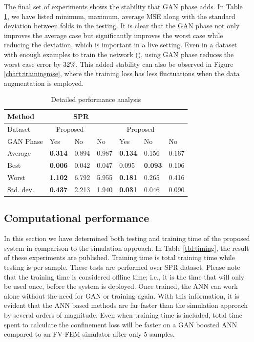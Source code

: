 \documentclass[10pt]{IEEEtran}
\begin{document}
The final set of experiments shows the stability that GAN phase adds. In Table \ref{tbl:all}, we have listed minimum, maximum, average MSE along with the standard deviation between folds in the testing. It is clear that the GAN phase not only improves the average case but significantly improves the worst case while reducing the deviation, which is important in a live setting. Even in a dataset with enough examples to train the network (\dszero), using GAN phase reduces the worst case error by 32\%. This added stability can also be observed in Figure \ref{chart:trainingmse}, where the training loss has less fluctuations when the data augmentation is employed.


\begin{table}
\caption{Detailed performance analysis}
\begin{tabular}{l|l|l|l|l|l|l}
	Method & \multicolumn{3}{c|}{SPR} & \multicolumn{3}{c}{\dszero{}} \\\hline
	Dataset & \multicolumn{2}{c|}{Proposed} & \cite{paper0}  & \multicolumn{2}{c|}{Proposed}   & \cite{paper0} \\\hline
	GAN Phase 			& Yes            & No    &  No     &   Yes            & No             & No    \\\hline
	Average   			& \textbf{0.314} & 0.894 & 0.987   &   \textbf{0.134} & 0.156          & 0.167 \\
	Best      			& \textbf{0.006} & 0.042 & 0.047   &   0.095          & \textbf{0.093} & 0.106 \\
	Worst     			& \textbf{1.102} & 6.792 & 5.955   &   \textbf{0.181} & 0.265          & 0.416 \\
	Std. dev.       	& \textbf{0.437} & 2.213 & 1.940   &   \textbf{0.031} & 0.046          & 0.090 \\
\end{tabular}
\label{tbl:all}
\end{table}


\subsection{Computational performance}

In this section we have determined both testing and training time of the proposed system in comparison to the simulation approach. In Table \ref{tbl:timing}, the result of these experiments are published. Training time is total training time while testing is per sample. These tests are performed over SPR dataset. Please note that the training time is considered offline time; i.e., it is the time that will only be used once, before the system is deployed. Once trained, the ANN can work alone without the need for GAN or training again. With this information, it is evident that the ANN based methods are far faster than the simulation approach by several orders of magnitude. Even when training time is included, total time spent to calculate the confinement loss will be faster on a GAN boosted ANN compared to an FV-FEM simulator after only 5 samples.
\end{document}

